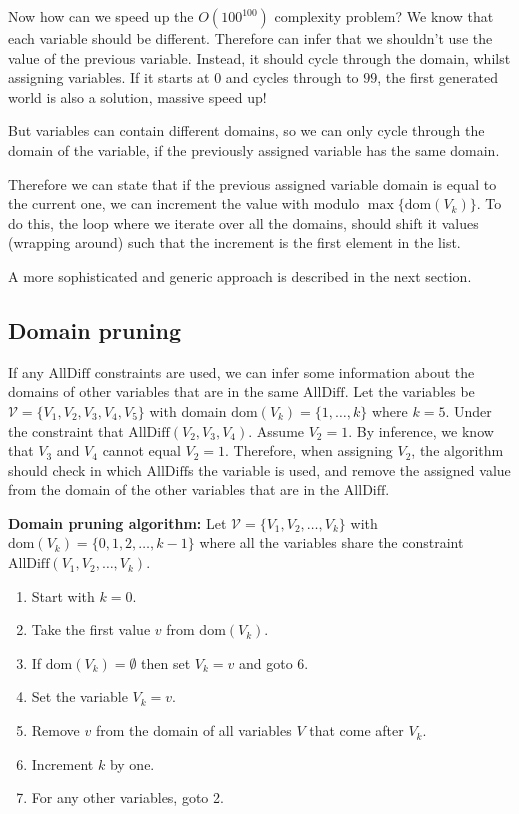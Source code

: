 \documentclass[11pt]{article}
\providecommand{\tightlist}{%
      \setlength{\itemsep}{0pt}\setlength{\parskip}{0pt}}
\begin{document}
    Now how can we speed up the \(O(100^{100})\) complexity problem? We know
that each variable should be different. Therefore can infer that we
shouldn't use the value of the previous variable. Instead, it should
cycle through the domain, whilst assigning variables. If it starts at
\(0\) and cycles through to \(99\), the first generated world is also a
solution, massive speed up!

But variables can contain different domains, so we can only cycle
through the domain of the variable, if the previously assigned variable
has the same domain.

Therefore we can state that if the previous assigned variable domain is
equal to the current one, we can increment the value with modulo
\(\max \{\textrm{dom}(V_k)\}\). To do this, the loop where we iterate
over all the domains, should shift it values (wrapping around) such that
the increment is the first element in the list.

A more sophisticated and generic approach is described in the next
section.

    \hypertarget{domain-pruning}{%
\subsection{Domain pruning}\label{domain-pruning}}

    If any \(\mathrm{AllDiff}\) constraints are used, we can infer some
information about the domains of other variables that are in the same
\(\mathrm{AllDiff}\). Let the variables be
\(\mathscr{V}=\{V_1,V_2,V_3,V_4,V_5\}\) with domain
\(\textrm{dom}(V_k) = \{1,\ldots,k\}\) where \(k=5\). Under the
constraint that \(\textrm{AllDiff}(V_2,V_3,V_4)\). Assume \(V_2=1\). By
inference, we know that \(V_3\) and \(V_4\) cannot equal \(V_2=1\).
Therefore, when assigning \(V_2\), the algorithm should check in which
\(\textrm{AllDiff}\)s the variable is used, and remove the assigned
value from the domain of the other variables that are in the
\(\textrm{AllDiff}\).

\textbf{Domain pruning algorithm:} Let
\(\mathscr{V}=\{V_1,V_2,\ldots,V_k\}\) with
\(\textrm{dom}(V_k)=\{0,1,2,\ldots,k-1\}\) where all the variables share
the constraint \(\textrm{AllDiff}(V_1,V_2,\ldots,V_k)\).

\begin{enumerate}
\def\labelenumi{\arabic{enumi}.}
\tightlist
\item
  Start with \(k=0\).
\item
  Take the first value \(v\) from \(\textrm{dom}(V_k)\).
\item
  If \(\textrm{dom}(V_k) = \emptyset\) then set \(V_k=v\) and goto 6.
\item
  Set the variable \(V_k=v\).
\item
  Remove \(v\) from the domain of all variables \(V\) that come after
  \(V_k\).
\item
  Increment \(k\) by one.
\item
  For any other variables, goto 2.
\end{enumerate}
\end{document}
